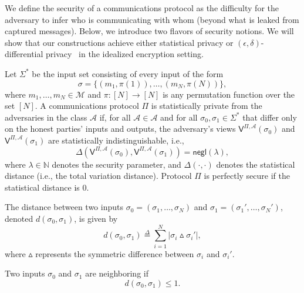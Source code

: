 We define the security of a communications protocol as the difficulty for the adversary to infer who is communicating with whom (beyond what is leaked from captured messages). Below, we introduce two flavors of security notions. We will show that our constructions achieve either statistical privacy or $(\epsilon,\delta)$-differential privacy~\cite{TCC:DMNS06} in the idealized encryption setting.\\

\begin{definition}  \label{def:statistical-privacy}
    Let $\Sigma^*$ be the input set consisting of every input of the form
    $$
    \sigma = \{(m_1, \pi(1)), \dots, (m_N, \pi(N))\},
    $$
    where $m_1, \dots, m_N \in \mathcal{M}$ and $\pi : [N] \rightarrow [N]$ is any permutation function over the set $[N]$. A communications protocol $\Pi$ is statistically private from the adversaries in the class $\mathcal{A}$ if, for all $\mathcal{A} \in \mathcal{A}$ and for all $\sigma_0, \sigma_1 \in \Sigma^*$ that differ only on the honest parties' inputs and outputs, the adversary's views $\mathsf{V}^{\Pi,\mathcal{A}}(\sigma_0)$ and $\mathsf{V}^{\Pi,\mathcal{A}}(\sigma_1)$ are statistically indistinguishable, i.e.,
    $$
    \Delta(\mathsf{V}^{\Pi,\mathcal{A}}(\sigma_0), \mathsf{V}^{\Pi,\mathcal{A}}(\sigma_1)) = \mathsf{negl}(\lambda),
    $$
    where $\lambda \in \mathbb{N}$ denotes the security parameter, and $\Delta(\cdot, \cdot)$ denotes the statistical distance (i.e., the total variation distance). Protocol $\Pi$ is perfectly secure if the statistical distance is 0.
\end{definition}

\begin{definition}  \label{def:distance-between-inputs} 
    The distance between two inputs $\sigma_0 = (\sigma_1, \dots, \sigma_N)$ and $\sigma_1 = (\sigma_1', \dots, \sigma_N')$, denoted $d(\sigma_0, \sigma_1)$, is given by
    $$
    d(\sigma_0, \sigma_1) \overset{\Delta}{=} \sum_{i=1}^{N} |\sigma_{i} \vartriangle \sigma_{i}'|,
    $$
    where $\vartriangle$ represents the symmetric difference between $\sigma_{i}$ and $\sigma_{i}'$.\\
\end{definition}

\begin{definition}  \label{def:neighboring-inputs} 
    Two inputs $\sigma_0$ and $\sigma_1$ are neighboring if 
    $$
    d(\sigma_0, \sigma_1) \leq 1.
    $$\\
\end{definition}

